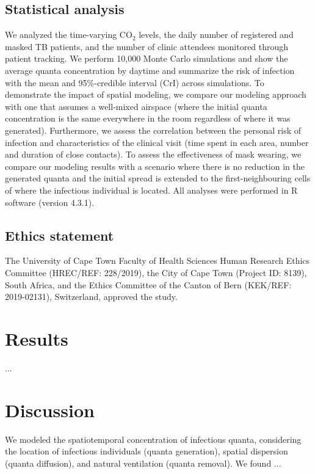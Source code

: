 \documentclass[fleqn,11pt]{wlscirep}
\begin{document}
\subsection{Statistical analysis}

We analyzed the time-varying CO$_2$ levels, the daily number of registered and masked TB patients, and the number of clinic attendees monitored through patient tracking. We perform 10,000 Monte Carlo simulations and show the average quanta concentration by daytime and summarize the risk of infection with the mean and 95\%-credible interval (CrI) across simulations. To demonstrate the impact of spatial modeling, we compare our modeling approach with one that assumes a well-mixed airspace (\ie where the initial quanta concentration is the same everywhere in the room regardless of where it was generated). Furthermore, we assess the correlation between the personal risk of infection and characteristics of the clinical visit (time spent in each area, number and duration of close contacts). To assess the effectiveness of mask wearing, we compare our modeling results with a scenario where there is no reduction in the generated quanta and the initial spread is extended to the first-neighbouring cells of where the infectious individual is located. All analyses were performed in R software (version 4.3.1)\cite{RCoreTeam2023}.


\subsection{Ethics statement}

The University of Cape Town Faculty of Health Sciences Human Research Ethics Committee (HREC/REF: 228/2019), the City of Cape Town (Project ID: 8139), South Africa, and the Ethics Committee of the Canton of Bern (KEK/REF: 2019-02131), Switzerland, approved the study.

\newpage

\section{Results}

...


\FloatBarrier

\newpage

\section{Discussion}

We modeled the spatiotemporal concentration of infectious quanta, considering the location of infectious individuals (quanta generation), spatial dispersion (quanta diffusion), and natural ventilation (quanta removal). We found ... 
\end{document}
